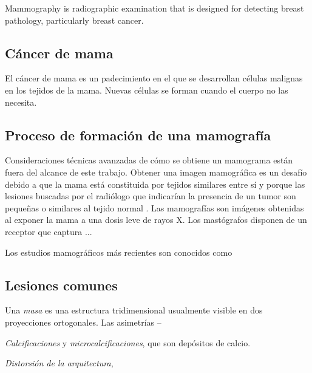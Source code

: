 Mammography is radiographic examination that is designed for detecting breast
pathology, particularly breast cancer. \cite{bushberg2011essential}

\subsection{Cáncer de mama} %

El cáncer de mama es un padecimiento en el que se desarrollan células malignas
en los tejidos de la mama. Nuevas células se forman cuando el cuerpo no las
necesita. 

\subsection{Proceso de formación de una mamografía}

Consideraciones técnicas avanzadas de cómo se obtiene un mamograma están fuera
del alcance de este trabajo. Obtener una imagen mamográfica es un desafío
debido a que la mama está constituida por tejidos similares entre sí y porque
las lesiones buscadas por el radiólogo que indicarían la presencia de un tumor
son pequeñas o similares al tejido normal \cite{mxcancer}. Las mamografías son
imágenes obtenidas al exponer la mama a una dosis leve de rayos X. Los
mastógrafos disponen de un receptor que captura ...

Los estudios mamográficos más recientes son conocidos como 

\subsection{Lesiones comunes}


Una \textit{masa} es una estructura tridimensional usualmente visible en dos
proyecciones ortogonales. Las {asimetrías} --

\textit{Calcificaciones} y \textit{microcalcificaciones}, que son depósitos de calcio.

\textit{Distorsión de la arquitectura}, 

